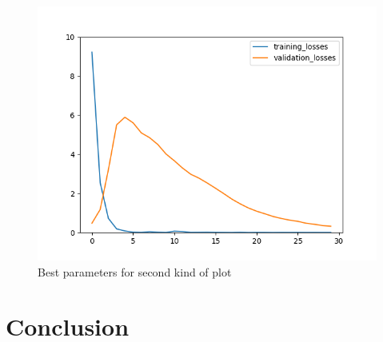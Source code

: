 \documentclass[10pt,conference]{IEEEtran}
\begin{document}
\begin{figure}
  \centering
  \includegraphics[scale=.4]{images/bestplot_2.png}
  \caption{Best parameters for second kind of plot}
\end{figure}

\section{Conclusion}



\end{document}
